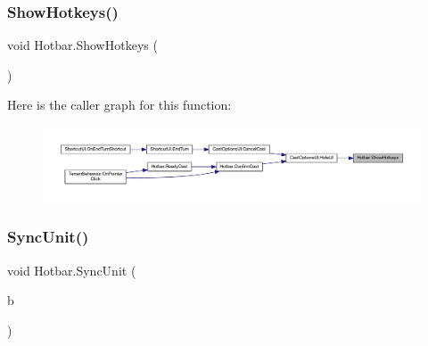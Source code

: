 \subsubsection{\texorpdfstring{ShowHotkeys()}{ShowHotkeys()}}
{\footnotesize\ttfamily void Hotbar.\+Show\+Hotkeys (\begin{DoxyParamCaption}{ }\end{DoxyParamCaption})}

Here is the caller graph for this function\+:\nopagebreak
\begin{figure}[H]
\begin{center}
\leavevmode
\includegraphics[width=350pt]{class_hotbar_a989b6728a8d86d60a851f68954edab90_icgraph}
\end{center}
\end{figure}
\mbox{\label{class_hotbar_a1e796a0a133ee0743aa8585c05980f9b}} 
\subsubsection{\texorpdfstring{SyncUnit()}{SyncUnit()}}
{\footnotesize\ttfamily void Hotbar.\+Sync\+Unit (\begin{DoxyParamCaption}\item[{\mbox{\hyperlink{class_base_unit}{Base\+Unit}}}]{b }\end{DoxyParamCaption})}

